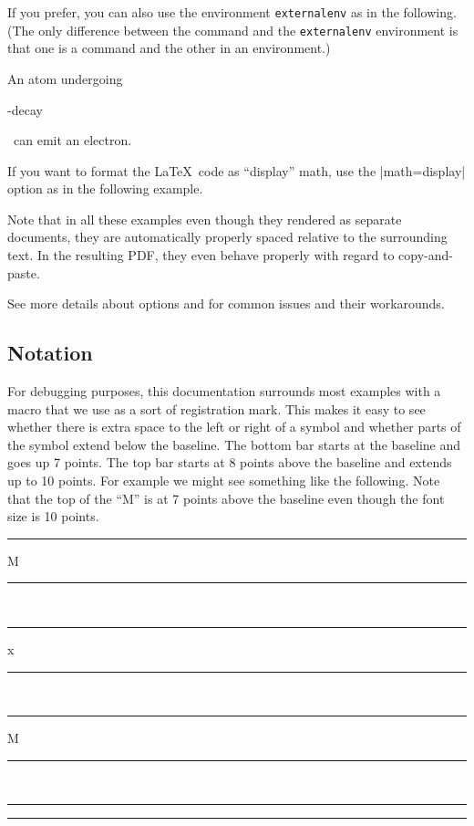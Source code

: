 \documentclass[10pt]{ltxdoc}
\newcommand{\env}[1]{\texttt{#1}}
\def\sz{%
  \rule{0.2em}{7pt}%
  \llap{\rule[8pt]{0.2em}{2pt}}%
}
\def\sx{%
  \rule{1.5pt}{4.5pt}%
  \llap{\rule[5.5pt]{1.5pt}{1.5pt}}%
  \llap{\rule[8pt]{1.5pt}{2pt}}%
}
\def\gl{%
  \rule[5.5pt]{3.5pt}{1.5pt}%
  \llap{\sx}}
\def\gr{%
  \rlap{\sx}%
  \rule[5.5pt]{3.5pt}{1.5pt}%
  }
\begin{document}
If you prefer, you can also use the environment \env{externalenv} as in the
following.
(The only difference between the  command and the
\env{externalenv} environment is that one is a command and the other in
an environment.)

\begin{tcblisting}{}
An atom undergoing
\begin{externalenv}[preamble={\usepackage{textgreek}}]
\textbeta-decay
\end{externalenv}
~can emit an electron.
\end{tcblisting}

If you want to format the \LaTeX\ code as ``display'' math, use the
|math=display| option as in the following example.

\begin{tcblisting}{}
\end{tcblisting}

Note that in all these examples even though they rendered as separate
documents, they are automatically properly spaced relative to the
surrounding text.
In the resulting PDF, they even behave properly with regard to
copy-and-paste.

See  more details about options and  for common issues and their workarounds.

\subsection{Notation}
\label{subsec:Notation}

For debugging purposes, this documentation surrounds most examples with
a  macro that we use as a sort of registration mark.
This makes it easy to see whether there is extra space to the left or
right of a symbol and whether parts of the symbol extend below the
baseline.
The bottom bar starts at the baseline and goes up 7 points.
The top bar starts at 8 points above the baseline and extends up to 10
points.
For example we might see something like the following.
Note that the top of the ``M'' is at 7 points above the baseline
even though the font size is 10 points.

\begin{tcblisting}{}
\sz M\sz
~\gl x\gr
~\gl M\gr
~\gl\gr
\end{tcblisting}

\end{document}
